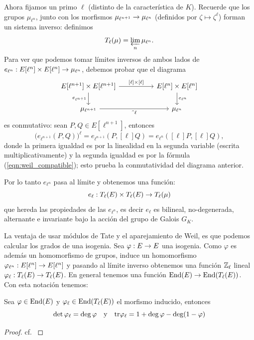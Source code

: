 \documentclass[../../tesis_maestria]{subfiles}
\begin{document}
Ahora fijamos un primo $\ell$ (distinto de la caracter\'istica de $K$). Recuerde que los grupos
$\mu_{\ell^n}$, junto con los morfismos $\mu_{\ell^{n+1}}\rightarrow\mu_{\ell^n}$ (definidos por
$\zeta\mapsto\zeta^{\ell}$) forman un sistema inverso: definimos
\[
  T_{\ell}(\mu)=\varprojlim_n \mu_{\ell^n}.
\]
Para ver que podemos tomar l\'imites inversos de ambos lados de
$e_{\ell^n}:E[\ell^n]\times E[\ell^n]\rightarrow\mu_{\ell^n}$, debemos probar que el diagrama
\[
  \begin{tikzcd}[column sep=50]
    E[\ell^{n+1}]\times E[\ell^{n+1}] \arrow[r,"\mathrm{[}\ell\mathrm{]}\times\mathrm{[}\ell\mathrm{]}"]
    \arrow[d,"e_{\ell^{n+1}}"'] &
    E[\ell^n]\times E[\ell^n] \arrow[d,"e_{\ell^n}"] \\
    \mu_{\ell^{n+1}} \arrow[r,"\text{\textasciicircum} \ell"'] & \mu_{\ell^n}
  \end{tikzcd}
\]
es conmutativo: sean $P,Q\in E[\ell^{n+1}]$, entonces
\[
  \big( e_{\ell^{n+1}}(P,Q) \big)^{\ell}=e_{\ell^{n+1}}(P,[\ell]Q)= e_{\ell^n}([\ell]P,[\ell]Q),
\]
donde la primera igualdad es por la linealidad en la segunda variable (escrita multiplicativamente)
y la segunda igualdad es por la f\'ormula (\ref{eqn:weil_compatible}); esto prueba la conmutatividad
del diagrama anterior.

Por lo tanto $e_{\ell^n}$ pasa al l\'imite y obtenemos una funci\'on:
\[
  e_{\ell}:T_{\ell}(E)\times T_{\ell}(E) \rightarrow T_{\ell}(\mu)
\]
que hereda las propiedades de las $e_{\ell^n}$, es decir $e_{\ell}$ es bilineal, no-degenerada,
alternante e invariante bajo la acci\'on del grupo de Galois $G_K$.

La ventaja de usar m\'odulos de Tate y el aparejamiento de Weil, es que podemos calcular los grados
de una isogenia. Sea $\varphi:E\rightarrow E$ una isogenia. Como $\varphi$ es adem\'as un homomorfismo de
grupos, induce un homomorfismo $\varphi_{\ell^n}:E[\ell^n]\rightarrow E[\ell^n]$ y pasando al l\'imite inverso
obtenemos una funci\'on $\mathbb{Z}_{\ell}$ lineal $\varphi_{\ell}:T_{\ell}(E)\rightarrow T_{\ell}(E)$. En general
tenemos una funci\'on $\mathrm{End}(E)\rightarrow\mathrm{End}(T_{\ell}(E))$. Con esta notaci\'on tenemos:

\begin{prop}\label{prop:detweil}
  Sea $\varphi\in\mathrm{End}(E)$ y $\varphi_{\ell}\in\mathrm{End}(T_{\ell}(E))$ el morfismo inducido, entonces
  \[
    \det\varphi_{\ell}=\deg\varphi \quad\mathrm{y}\quad
    \mathrm{tr}\varphi_{\ell}=1+\deg\varphi-\deg(1-\varphi)
  \]
\end{prop}

\begin{proof}
  cf. \cite[cap\'itulo III, \S8, proposici\'on 8.6]{SilvermanTAOEC}
\end{proof}
\end{document}
